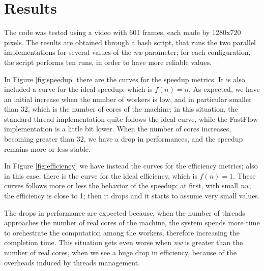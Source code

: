 \section{Results}

The code was tested using a video with 601 frames, each made by 1280x720 pixels. The results are obtained through a bash script, that runs the two parallel implementations for several values of the \emph{nw} parameter; for each configuration, the script performs ten runs, in order to have more reliable values.

In Figure \ref{fig:speedup} there are the curves for the speedup metrics. It is also included a curve for the ideal speedup, which is $f(n) = n$. As expected, we have an initial increase when the number of workers is low, and in particular smaller than 32, which is the number of cores of the machine; in this situation, the standard thread implementation quite follows the ideal curve, while the FastFlow implementation is a little bit lower. When the number of cores increases, becoming greater than 32, we have a drop in performances, and the speedup remains more or less stable.

In Figure \ref{fig:efficiency} we have instead the curves for the efficiency metrics; also in this case, there is the curve for the ideal efficiency, which is $f(n)=1$. These curves follows more or less the behavior of the speedup: at first, with small \emph{nw}, the efficiency is close to 1; then it drops and it starts to assume very small values.

The drops in performance are expected because, when the number of threads approaches the number of real cores of the machine, the system spends more time to orchestrate the computation among the workers, therefore increasing the completion time. This situation gets even worse when \emph{nw} is greater than the number of real cores, when we see a huge drop in efficiency, because of the overheads induced by threads management.

